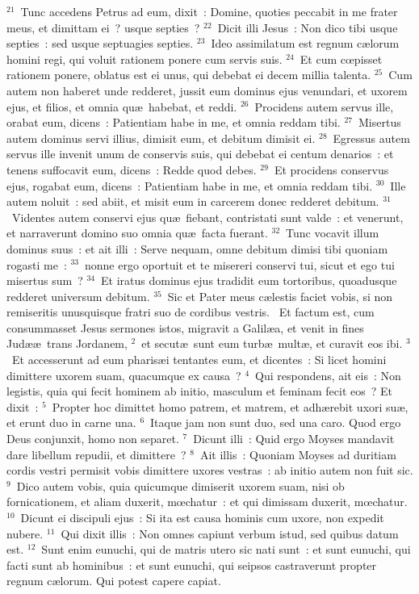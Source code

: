 ${}^{21}$~Tunc accedens Petrus ad eum, dixit~: Domine, quoties peccabit in me frater meus, et dimittam ei~? usque septies~?
${}^{22}$~Dicit illi Jesus~: Non dico tibi usque septies~: sed usque septuagies septies.
${}^{23}$~Ideo assimilatum est regnum c\ae lorum homini regi, qui voluit rationem ponere cum servis suis.
${}^{24}$~Et cum cœpisset rationem ponere, oblatus est ei unus, qui debebat ei decem millia talenta.
${}^{25}$~Cum autem non haberet unde redderet, jussit eum dominus ejus venundari, et uxorem ejus, et filios, et omnia qu\ae\ habebat, et reddi.
${}^{26}$~Procidens autem servus ille, orabat eum, dicens~: Patientiam habe in me, et omnia reddam tibi.
${}^{27}$~Misertus autem dominus servi illius, dimisit eum, et debitum dimisit ei.
${}^{28}$~Egressus autem servus ille invenit unum de conservis suis, qui debebat ei centum denarios~: et tenens suffocavit eum, dicens~: Redde quod debes.
${}^{29}$~Et procidens conservus ejus, rogabat eum, dicens~: Patientiam habe in me, et omnia reddam tibi.
${}^{30}$~Ille autem noluit~: sed abiit, et misit eum in carcerem donec redderet debitum.
${}^{31}$~Videntes autem conservi ejus qu\ae\ fiebant, contristati sunt valde~: et venerunt, et narraverunt domino suo omnia qu\ae\ facta fuerant.
${}^{32}$~Tunc vocavit illum dominus suus~: et ait illi~: Serve nequam, omne debitum dimisi tibi quoniam rogasti me~:
${}^{33}$~nonne ergo oportuit et te misereri conservi tui, sicut et ego tui misertus sum~?
${}^{34}$~Et iratus dominus ejus tradidit eum tortoribus, quoadusque redderet universum debitum.
${}^{35}$~Sic et Pater meus c\ae lestis faciet vobis, si non remiseritis unusquisque fratri suo de cordibus vestris.
~Et factum est, cum consummasset Jesus sermones istos, migravit a Galil\ae a, et venit in fines Jud\ae \ae\ trans Jordanem,
${}^{2}$~et secut\ae\ sunt eum turb\ae\ mult\ae , et curavit eos ibi.
${}^{3}$~Et accesserunt ad eum pharis\ae i tentantes eum, et dicentes~: Si licet homini dimittere uxorem suam, quacumque ex causa~?
${}^{4}$~Qui respondens, ait eis~: Non legistis, quia qui fecit hominem ab initio, masculum et feminam fecit eos~? Et dixit~:
${}^{5}$~Propter hoc dimittet homo patrem, et matrem, et adh\ae rebit uxori su\ae , et erunt duo in carne una.
${}^{6}$~Itaque jam non sunt duo, sed una caro. Quod ergo Deus conjunxit, homo non separet.
${}^{7}$~Dicunt illi~: Quid ergo Moyses mandavit dare libellum repudii, et dimittere~?
${}^{8}$~Ait illis~: Quoniam Moyses ad duritiam cordis vestri permisit vobis dimittere uxores vestras~: ab initio autem non fuit sic.
${}^{9}$~Dico autem vobis, quia quicumque dimiserit uxorem suam, nisi ob fornicationem, et aliam duxerit, mœchatur~: et qui dimissam duxerit, mœchatur.
${}^{10}$~Dicunt ei discipuli ejus~: Si ita est causa hominis cum uxore, non expedit nubere.
${}^{11}$~Qui dixit illis~: Non omnes capiunt verbum istud, sed quibus datum est.
${}^{12}$~Sunt enim eunuchi, qui de matris utero sic nati sunt~: et sunt eunuchi, qui facti sunt ab hominibus~: et sunt eunuchi, qui seipsos castraverunt propter regnum c\ae lorum. Qui potest capere capiat.


